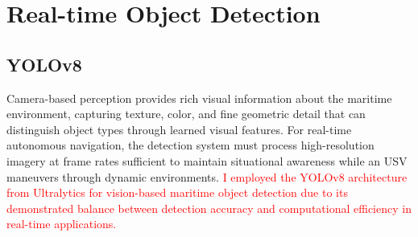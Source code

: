 \documentclass{erauthesis}
\begin{document}





\chapter{Real-time Object Detection} \label{realtime_object_detection}


\section{YOLOv8} \label{yolo}

Camera-based perception provides rich visual information about the maritime environment, capturing texture, color, and fine geometric detail that can distinguish object types through learned visual features.
For real-time autonomous navigation, the detection system must process high-resolution imagery at frame rates sufficient to maintain situational awareness while an \ac{USV} maneuvers through dynamic environments.
\textcolor{red}{I employed the YOLOv8 architecture from Ultralytics for vision-based maritime object detection due to its demonstrated balance between detection accuracy and computational efficiency in real-time applications.}
\end{document}

